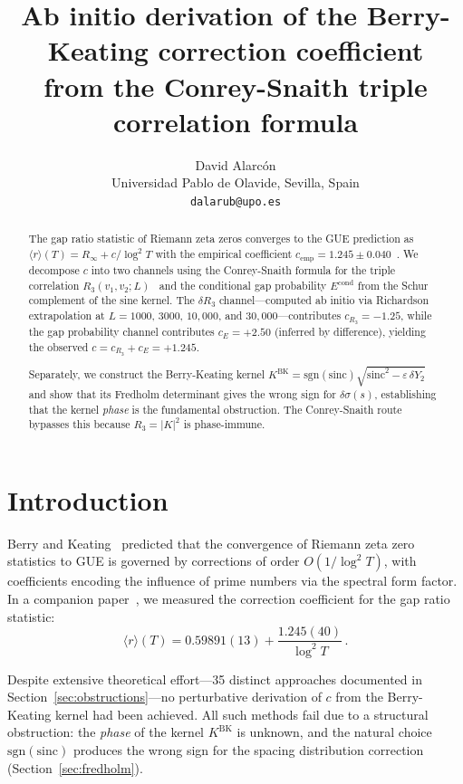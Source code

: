 \documentclass[11pt]{article}
\title{\textbf{Ab initio derivation of the Berry-Keating correction coefficient\\
from the Conrey-Snaith triple correlation formula}}
\author{David Alarc\'on\\
\small Universidad Pablo de Olavide, Sevilla, Spain\\
\small \texttt{dalarub@upo.es}}
\date{}
\begin{document}
\maketitle

\begin{abstract}
The gap ratio statistic of Riemann zeta zeros converges to the GUE prediction
as $\langle r\rangle(T) = R_\infty + c/\log^2 T$ with the empirical coefficient
$c_{\mathrm{emp}} = 1.245 \pm 0.040$~\cite{alarcon2026a}. We decompose $c$
into two channels using the Conrey-Snaith formula for the triple correlation
$R_3(v_1, v_2; L)$~\cite{conrey2005, conreysnaith2008} and the conditional
gap probability $E^{\mathrm{cond}}$ from the Schur complement of the sine kernel.
The $\delta R_3$ channel---computed ab initio via Richardson extrapolation at
$L = 1000$, $3000$, $10{,}000$, and $30{,}000$---contributes $c_{R_3} = -1.25$, while the
gap probability channel contributes $c_{E} = +2.50$ (inferred by difference),
yielding the observed $c = c_{R_3} + c_E = +1.245$.

Separately, we construct the Berry-Keating kernel
$K^{\mathrm{BK}} = \mathrm{sgn}(\mathrm{sinc})\sqrt{\mathrm{sinc}^2 - \varepsilon\,\delta Y_2}$
and show that its Fredholm determinant gives the wrong sign for $\delta\sigma(s)$,
establishing that the kernel \emph{phase} is the fundamental obstruction.
The Conrey-Snaith route bypasses this because $R_3 = |K|^2$ is phase-immune.
\end{abstract}


\section{Introduction}

Berry and Keating~\cite{berry1999, bogomolny1996} predicted that the convergence
of Riemann zeta zero statistics to GUE is governed by corrections of order
$O(1/\log^2 T)$, with coefficients encoding the influence of prime numbers via
the spectral form factor. In a companion paper~\cite{alarcon2026a}, we measured
the correction coefficient for the gap ratio statistic:
\begin{equation}
\langle r\rangle(T) = 0.59891(13) + \frac{1.245(40)}{\log^2 T}\,.
\label{eq:empirical}
\end{equation}

Despite extensive theoretical effort---35 distinct approaches documented in
Section~\ref{sec:obstructions}---no perturbative derivation of $c$ from the
Berry-Keating kernel had been achieved. All such methods fail due to a
structural obstruction: the \emph{phase} of the kernel $K^{\mathrm{BK}}$
is unknown, and the natural choice $\mathrm{sgn}(\mathrm{sinc})$ produces
the wrong sign for the spacing distribution correction
(Section~\ref{sec:fredholm}).
\end{document}
